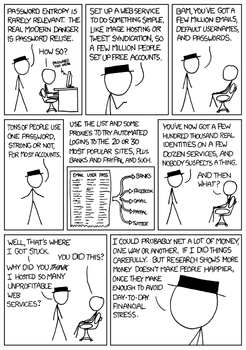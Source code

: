 \documentclass[utf8]{beamer}
\begin{document}
\begin{frame}
  \begin{columns}[c]
    \centering
    \includegraphics[width=\textwidth]{password_reuse_1.png}
    \centering

\end{columns}
\end{frame}
\end{document}
